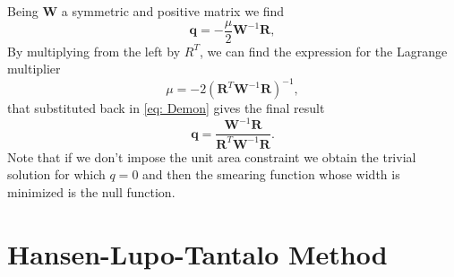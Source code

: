 \documentclass[a4paper,10pt]{article}
\begin{document}
Being $\textbf{W}$ a symmetric and positive matrix we find
\begin{equation}\label{eq: Demon}
\textbf{q} = - \frac{\mu}{2} \textbf{W}^{-1}\textbf{R},
\end{equation}
By multiplying from the left by $R^T$, we can find the expression for the Lagrange multiplier 
\begin{equation}
\mu = -2(\textbf{R}^T \textbf{W}^{-1} \textbf{R})^{-1},
\end{equation}
that substituted back in \eqref{eq: Demon} gives the final result
\begin{equation}\label{eq: BGCoeff}
\textbf{q} = \frac{\textbf{W}^{-1}\textbf{R}}{\textbf{R}^T \textbf{W}^{-1} \textbf{R}}. 
\end{equation}
Note that if we don't impose the unit area constraint we obtain the trivial solution for which $q=0$ and then the smearing function whose width is minimized is the null function.

\section{Hansen-Lupo-Tantalo Method}
\end{document}

